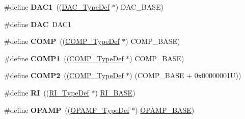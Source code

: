 \begin{DoxyCompactItemize}
\item 
\hypertarget{group___peripheral__declaration_gaffb5ff8779fa698f3c7165a617d56e4f}{\#define {\bfseries D\-A\-C1}~((\hyperlink{struct_d_a_c___type_def}{D\-A\-C\-\_\-\-Type\-Def} $\ast$) D\-A\-C\-\_\-\-B\-A\-S\-E)}\label{group___peripheral__declaration_gaffb5ff8779fa698f3c7165a617d56e4f}

\item 
\hypertarget{group___peripheral__declaration_ga4aa2a4ab86ce00c23035e5cee2e7fc7e}{\#define {\bfseries D\-A\-C}~D\-A\-C1}\label{group___peripheral__declaration_ga4aa2a4ab86ce00c23035e5cee2e7fc7e}

\item 
\hypertarget{group___peripheral__declaration_ga076912543697dbe4c46b79e8e44ad2fb}{\#define {\bfseries C\-O\-M\-P}~((\hyperlink{struct_c_o_m_p___type_def}{C\-O\-M\-P\-\_\-\-Type\-Def} $\ast$) C\-O\-M\-P\-\_\-\-B\-A\-S\-E)}\label{group___peripheral__declaration_ga076912543697dbe4c46b79e8e44ad2fb}

\item 
\hypertarget{group___peripheral__declaration_gaf5713f83009027d48805b049d55bb01b}{\#define {\bfseries C\-O\-M\-P1}~((\hyperlink{struct_c_o_m_p___type_def}{C\-O\-M\-P\-\_\-\-Type\-Def} $\ast$) C\-O\-M\-P\-\_\-\-B\-A\-S\-E)}\label{group___peripheral__declaration_gaf5713f83009027d48805b049d55bb01b}

\item 
\hypertarget{group___peripheral__declaration_ga6985fa7e9bb3c2edf15b29b7af210a2b}{\#define {\bfseries C\-O\-M\-P2}~((\hyperlink{struct_c_o_m_p___type_def}{C\-O\-M\-P\-\_\-\-Type\-Def} $\ast$) (C\-O\-M\-P\-\_\-\-B\-A\-S\-E + 0x00000001\-U))}\label{group___peripheral__declaration_ga6985fa7e9bb3c2edf15b29b7af210a2b}

\item 
\hypertarget{group___peripheral__declaration_ga7e71def3baefc10ec36f1dd48da4050e}{\#define {\bfseries R\-I}~((\hyperlink{struct_r_i___type_def}{R\-I\-\_\-\-Type\-Def} $\ast$) \hyperlink{group___peripheral__memory__map_ga8fdc749e6f184b3cd9b01f179af62e4c}{R\-I\-\_\-\-B\-A\-S\-E})}\label{group___peripheral__declaration_ga7e71def3baefc10ec36f1dd48da4050e}

\item 
\hypertarget{group___peripheral__declaration_gaaa993d5a85ac85c8abbd13e31d504bb6}{\#define {\bfseries O\-P\-A\-M\-P}~((\hyperlink{struct_o_p_a_m_p___type_def}{O\-P\-A\-M\-P\-\_\-\-Type\-Def} $\ast$) \hyperlink{group___peripheral__memory__map_ga6e9722d15c7ed794f0eca9682f64c03c}{O\-P\-A\-M\-P\-\_\-\-B\-A\-S\-E})}\label{group___peripheral__declaration_gaaa993d5a85ac85c8abbd13e31d504bb6}


\end{DoxyCompactItemize}
